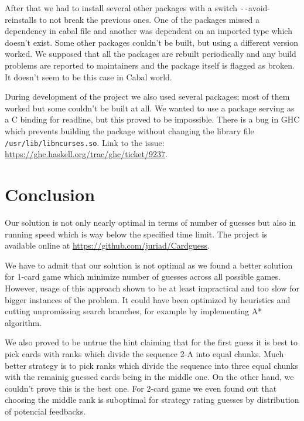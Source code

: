 \documentclass{article}
\begin{document}
After that we had to install several other packages with a switch \texttt{-{}-}avoid-reinstalls to not break the previous ones.
One of the packages missed a dependency in cabal file and another was dependent on an imported type which doesn't exist.
Some other packages couldn't be built, but using a different version worked.
We supposed that all the packages are rebuilt periodically and any build problems are reported to maintainers and the package itself is flagged as broken.
It doesn't seem to be this case in Cabal world.

During development of the project we also used several packages; most of them worked but some couldn't be built at all.
We wanted to use a package serving as a C binding for readline, but this proved to be impossible.
There is a bug in GHC which prevents building the package without changing the library file \texttt{/usr/lib/libncurses.so}.
Link to the issue: \url{https://ghc.haskell.org/trac/ghc/ticket/9237}.

\section{Conclusion}

Our solution is not only nearly optimal in terms of number of guesses but also in running speed which is way below the specified time limit.
The project is available online at \url{https://github.com/juriad/Cardguess}.

We have to admit that our solution is not optimal as we found a better solution for 1-card game which minimize number of guesses across all possible games.
However, usage of this approach shown to be at least impractical and too slow for bigger instances of the problem.
It could have been optimized by heuristics and cutting unpromissing search branches, for example by implementing A* algorithm.

We also proved to be untrue the hint claiming that for the first guess it is best to pick cards with ranks which divide the sequence 2-A into equal chunks.
Much better strategy is to pick ranks which divide the sequence into three equal chunks with the remainig guessed cards being in the middle one.
On the other hand, we couldn't prove this is the best one.
For 2-card game we even found out that choosing the middle rank is suboptimal for strategy rating guesses by distribution of potencial feedbacks.
\end{document}

